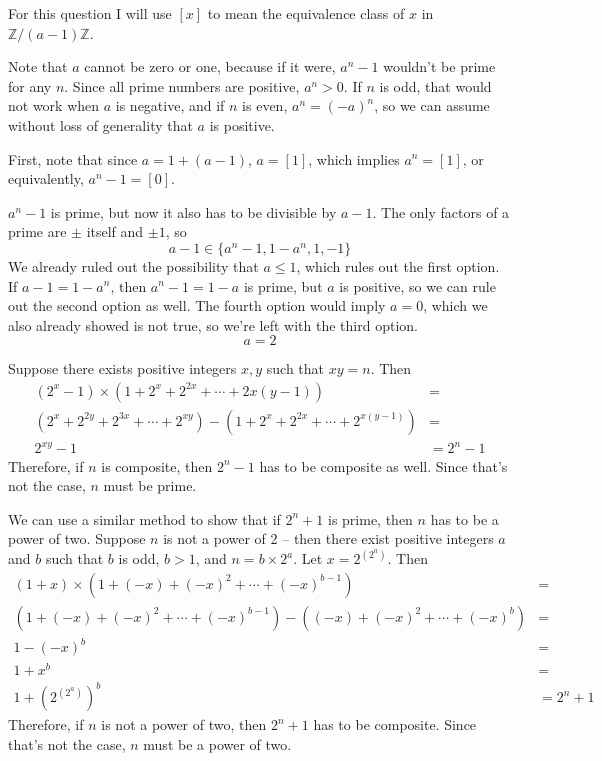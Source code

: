 \documentclass[12pt]{article}
\begin{document}
For this question I will use $[x]$ to mean the equivalence class of $x$ in $\mathbb{Z}/(a-1)\mathbb{Z}$.
\par
Note that $a$ cannot be zero or one, because if it were, $a^n-1$ wouldn't be prime for any $n$. Since all prime numbers are positive, $a^n > 0$. If $n$ is odd, that would not work when $a$ is negative, and if $n$ is even, $a^n = (-a)^n$, so we can assume without loss of generality that $a$ is positive.
\par
First, note that since $a = 1 + (a - 1)$, $a = [1]$, which implies $a^n = [1]$, or equivalently, $a^n-1=[0]$.
\par
$a^n-1$ is prime, but now it also has to be divisible by $a-1$. The only factors of a prime are $\pm$ itself and $\pm 1$, so
\[ a-1 \in \{ a^n-1, 1-a^n, 1, -1 \} \]
We already ruled out the possibility that $a \leq 1$, which rules out the first option. If $a-1=1-a^n$, then $a^n-1=1-a$ is prime, but $a$ is positive, so we can rule out the second option as well. The fourth option would imply $a=0$, which we also already showed is not true, so we're left with the third option.
\[ a=2 \]
\par
Suppose there exists positive integers $x, y$ such that $xy=n$. Then
\begin{align*}
    (2^x-1) \times (1 + 2^x + 2^{2x} + \cdots + 2{x(y-1)}) &= \\
    (2^x + 2^{2y} + 2^{3x} + \cdots + 2^{xy}) - (1 + 2^x + 2^{2x} + \cdots + 2^{x(y-1)}) &= \\
                                                           2^{xy} - 1 &= 2^n-1
\end{align*}
Therefore, if $n$ is composite, then $2^n-1$ has to be composite as well. Since that's not the case, $n$ must be prime.
\par
We can use a similar method to show that if $2^n+1$ is prime, then $n$ has to be a power of two. Suppose $n$ is not a power of 2 -- then there exist positive integers $a$ and $b$ such that $b$ is odd, $b>1$, and $n=b \times 2^a$. Let $x = 2^{(2^a)}$. Then
\begin{align*}
    (1+x) \times \left( 1 + (-x) + (-x)^2 + \cdots + (-x)^{b-1} \right) &= \\
    \left( 1 + (-x) + (-x)^2 + \cdots + (-x)^{b-1} \right) - \left( (-x) + (-x)^2 + \cdots + (-x)^b \right) &= \\
    1 - (-x)^b &= \\
    1 + x^b &= \\
    1 + \left( 2^{(2^a)} \right)^b &= 2^n + 1
\end{align*}
Therefore, if $n$ is not a power of two, then $2^n+1$ has to be composite. Since that's not the case, $n$ must be a power of two.
\end{document}
